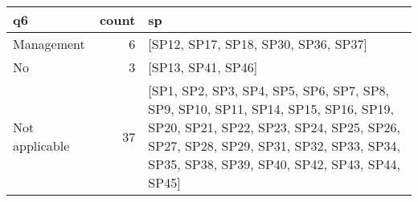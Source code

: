 \begin{tabular}{lrl}
\toprule
             q6 &  count &                                                                                                                                                                                                                     sp \\
\midrule
     Management &      6 &                                                                                                                                                                                   [SP12, SP17, SP18, SP30, SP36, SP37] \\
             No &      3 &                                                                                                                                                                                                     [SP13, SP41, SP46] \\
 Not applicable &     37 &  [SP1, SP2, SP3, SP4, SP5, SP6, SP7, SP8, SP9, SP10, SP11, SP14, SP15, SP16, SP19, SP20, SP21, SP22, SP23, SP24, SP25, SP26, SP27, SP28, SP29, SP31, SP32, SP33, SP34, SP35, SP38, SP39, SP40, SP42, SP43, SP44, SP45] \\
\bottomrule
\end{tabular}
